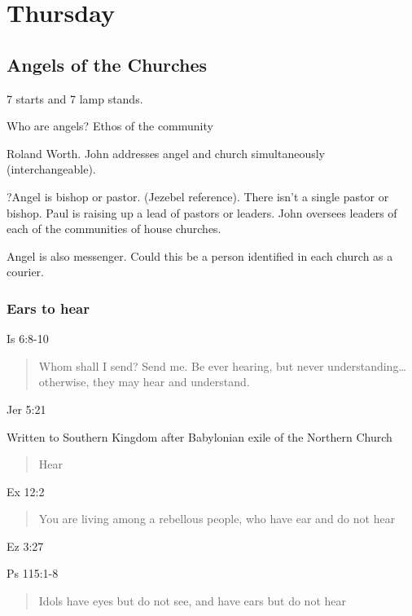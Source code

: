 \documentclass[
]{book}
\begin{document}
\hypertarget{thursday}{%
\chapter{Thursday}\label{thursday}}

\hypertarget{angels-of-the-churches}{%
\section{Angels of the Churches}\label{angels-of-the-churches}}

7 starts and 7 lamp stands.

Who are angels? Ethos of the community

Roland Worth. John addresses angel and church simultaneously (interchangeable).

?Angel is bishop or pastor. (Jezebel reference). There isn't a single pastor or bishop. Paul is raising up a lead of pastors or leaders. John oversees leaders of each of the communities of house churches.

Angel is also messenger. Could this be a person identified in each church as a courier.

\hypertarget{ears-to-hear}{%
\subsection{Ears to hear}\label{ears-to-hear}}

Is 6:8-10

\begin{quote}
Whom shall I send? Send me. Be ever hearing, but never understanding\ldots{} otherwise, they may hear and understand.
\end{quote}

Jer 5:21

Written to Southern Kingdom after Babylonian exile of the Northern Church

\begin{quote}
Hear
\end{quote}

Ex 12:2

\begin{quote}
You are living among a rebellous people, who have ear and do not hear
\end{quote}

Ez 3:27

Ps 115:1-8

\begin{quote}
Idols have eyes but do not see, and have ears but do not hear
\end{quote}
\end{document}
